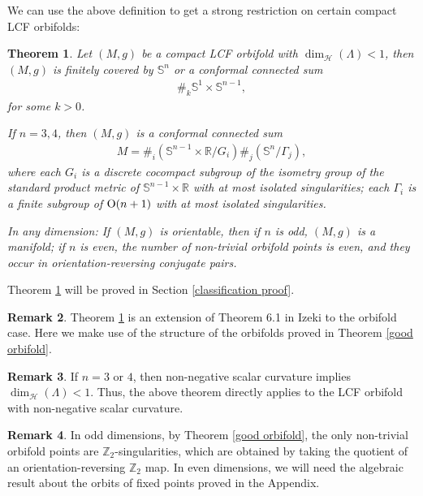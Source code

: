 \documentclass[12pt]{amsart}
\newtheorem{theorem}{Theorem}[section]
\theoremstyle{definition}
\newtheorem{remark}[theorem]{Remark}
\begin{document}
We can use the above definition to get a strong restriction on certain compact LCF orbifolds:
\begin{theorem}\label{classification} Let $(M,g)$ be a compact LCF orbifold with $\dim_{\mathcal{H}}(\Lambda) < 1$, then $(M,g)$ is finitely covered by $\mathbb{S}^n$ or a conformal connected sum
\begin{align*}
    \#_k \mathbb{S}^1\times \mathbb{S}^{n-1},
\end{align*}
for some $k>0$. %

If $n = 3,4$, then $(M,g)$ is a conformal connected sum 
\begin{align*}
M = \#_i  (\mathbb{S}^{n-1} \times \mathbb{R}/G_i) \#_j (\mathbb{S}^n/\Gamma_j),
\end{align*}
where each $G_i$ is a discrete cocompact subgroup of the isometry group of the standard product metric of $\mathbb{S}^{n-1}\times \mathbb{R}$ with at most isolated singularities; each $\Gamma_i$ is a finite subgroup of ${\rm{O}}(n+1)$ with at most isolated singularities. 

In any dimension: If $(M,g)$ is orientable, then if $n$ is odd, $(M,g)$ is a manifold; if $n$ is even, the number of non-trivial orbifold points is even, and they occur in orientation-reversing conjugate pairs. 
\end{theorem}
Theorem \ref{classification} will be proved in Section \ref{classification proof}.

\begin{remark}
    Theorem \ref{classification} is an extension of Theorem 6.1 in Izeki \cite{Ilimit} to the orbifold case. Here we make use of the structure of the orbifolds proved in Theorem \ref{good orbifold}.
\end{remark}

\begin{remark}\label{n=3,4} If $n = 3$ or $4$, then non-negative scalar curvature implies $\dim_{\mathcal{H}}(\Lambda) < 1$. Thus, the above theorem directly applies to the LCF orbifold with non-negative scalar curvature.
\end{remark}

\begin{remark}
    In odd dimensions, by Theorem \ref{good orbifold}, the only non-trivial orbifold points are $\mathbb{Z}_2$-singularities, which are obtained by taking the quotient of an orientation-reversing $\mathbb{Z}_2$ map. In even dimensions, we will need the algebraic result about the orbits of fixed points proved in the Appendix.
\end{remark}
\end{document}
